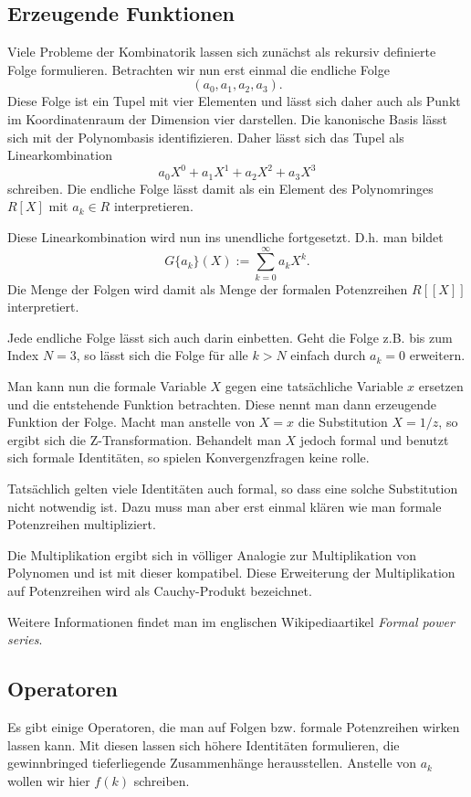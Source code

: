 \documentclass[a4paper,12pt,fleqn]{article}
\begin{document}
\subsection{Erzeugende Funktionen}
Viele Probleme der Kombinatorik lassen sich zunächst als
rekursiv definierte Folge formulieren. Betrachten wir nun erst einmal
die endliche Folge
\[(a_0,a_1,a_2,a_3).\]
Diese Folge ist ein Tupel mit vier Elementen und lässt sich
daher auch als Punkt im Koordinatenraum der Dimension vier darstellen.
Die kanonische Basis lässt sich mit der Polynombasis identifizieren.
Daher lässt sich das Tupel als Linearkombination
\[a_0X^0+a_1X^1+a_2X^2+a_3X^3\]
schreiben. Die endliche Folge lässt damit als ein Element
des Polynomringes $R[X]$ mit $a_k\in R$ interpretieren.

Diese Linearkombination wird nun ins unendliche fortgesetzt.
D.h. man bildet
\begin{equation}
G\{a_k\}(X) := \sum_{k=0}^\infty a_kX^k.
\end{equation}
Die Menge der Folgen wird damit als Menge der formalen
Potenzreihen $R[[X]]$ interpretiert.

Jede endliche Folge lässt sich auch darin einbetten.
Geht die Folge z.B. bis zum Index $N=3$, so lässt sich die Folge
für alle $k>N$ einfach durch $a_k=0$ erweitern.

Man kann nun die formale Variable $X$ gegen eine tatsächliche
Variable $x$ ersetzen und die entstehende Funktion betrachten.
Diese nennt man dann erzeugende Funktion der Folge. Macht man anstelle
von $X=x$ die Substitution $X=1/z$, so ergibt sich die
Z-Transformation. Behandelt man $X$ jedoch formal und
benutzt sich formale Identitäten, so spielen Konvergenzfragen
keine rolle.

Tatsächlich gelten viele Identitäten auch formal, so dass eine
solche Substitution nicht notwendig ist. Dazu muss man aber erst
einmal klären wie man formale Potenzreihen multipliziert.

Die Multiplikation ergibt sich in völliger Analogie zur
Multiplikation von Polynomen und ist mit dieser kompatibel.
Diese Erweiterung der Multiplikation auf Potenzreihen wird
als Cauchy-Produkt bezeichnet.

Weitere Informationen findet man im englischen Wikipediaartikel
\textit{Formal power series}.


\subsection{Operatoren}
Es gibt einige Operatoren, die man auf Folgen bzw. formale
Potenzreihen wirken lassen kann. Mit diesen lassen sich höhere
Identitäten formulieren, die gewinnbringed tieferliegende
Zusammenhänge herausstellen. Anstelle von $a_k$ wollen wir
hier $f(k)$ schreiben.
\end{document}

